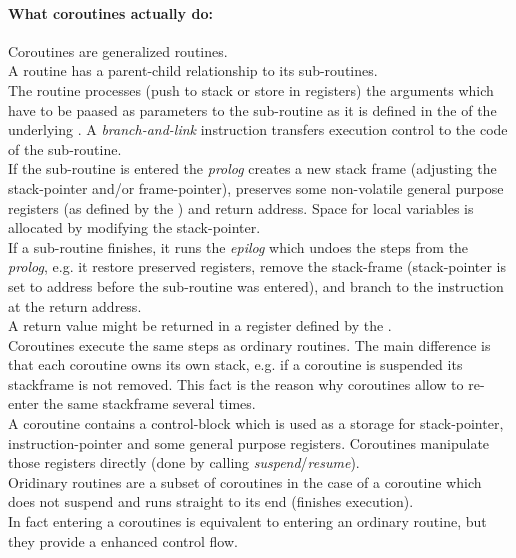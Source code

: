 \paragraph*{What coroutines actually do:}
Coroutines are generalized routines.\\
\newline
A routine has a parent-child relationship to its sub-routines.\\
The routine processes (push to stack or store in registers) the arguments which
have to be paased as parameters to the sub-routine as it is defined in the \cv
of the underlying \ABI. A \textit{branch-and-link} instruction transfers
execution control to the code of the sub-routine.\\
If the sub-routine is entered the \textit{prolog} creates a new stack frame
(adjusting the stack-pointer and/or frame-pointer), preserves some
non-volatile general purpose registers (as defined by the \cv) and return
address. Space for local variables is allocated by modifying the
stack-pointer.\\
If a sub-routine  finishes, it runs the \textit{epilog} which undoes the steps
from the \textit{prolog}, e.g. it restore preserved registers, remove the
stack-frame (stack-pointer is set to address before the sub-routine was entered),
and branch to the instruction at the return address.\\
A return value might be returned in a register defined by the \cv.\\
\newline
Coroutines execute the same steps as ordinary routines. The main difference is 
that each coroutine owns its own stack, e.g. if a coroutine is suspended its
stackframe is not removed. This fact is the reason why coroutines allow to
re-enter the same stackframe several times.\\
A coroutine contains a control-block which is used as a storage for
stack-pointer, instruction-pointer and some general purpose registers.
Coroutines manipulate those registers directly (done by calling
\textit{suspend}/\textit{resume}).\\
\newline
Oridinary routines are a subset of coroutines in the case of a coroutine which
does not suspend and runs straight to its end (finishes execution).\\
\newline
In fact entering a coroutines is equivalent to entering an ordinary routine, but
they provide a enhanced control flow.
